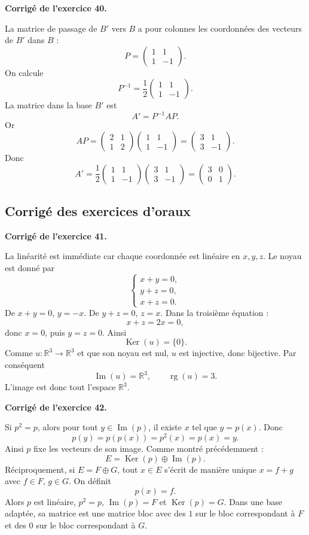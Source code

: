 \documentclass[11pt,a4paper]{article}
\newcommand{\corr}[1]{
    \vspace{0.4cm}
    \noindent\textbf{\textcolor{blue!60!black}{Corrigé de l'exercice #1.}}
    \par\vspace{0.1cm}
}
\newcommand{\Ker}{\operatorname{Ker}}
\newcommand{\Img}{\operatorname{Im}}
\newcommand{\rg}{\operatorname{rg}}
\begin{document}
\corr{40}
La matrice de passage de $B'$ vers $B$ a pour colonnes les coordonnées des vecteurs de $B'$ dans $B$ :
\[
P=
\begin{pmatrix}
1&1\\
1&-1
\end{pmatrix}.
\]
On calcule
\[
P^{-1}=\frac12
\begin{pmatrix}
1&1\\
1&-1
\end{pmatrix}.
\]
La matrice dans la base $B'$ est
\[
A'=P^{-1}AP.
\]
Or
\[
AP=
\begin{pmatrix}
2&1\\
1&2
\end{pmatrix}
\begin{pmatrix}
1&1\\
1&-1
\end{pmatrix}
=
\begin{pmatrix}
3&1\\
3&-1
\end{pmatrix}.
\]
Donc
\[
A'=
\frac12
\begin{pmatrix}
1&1\\
1&-1
\end{pmatrix}
\begin{pmatrix}
3&1\\
3&-1
\end{pmatrix}
=
\begin{pmatrix}
3&0\\
0&1
\end{pmatrix}.
\]

\subsection{Corrigé des exercices d'oraux}

\corr{41}
La linéarité est immédiate car chaque coordonnée est linéaire en $x,y,z$.
Le noyau est donné par
\[
\begin{cases}
x+y=0,\\
y+z=0,\\
x+z=0.
\end{cases}
\]
De $x+y=0$, $y=-x$. De $y+z=0$, $z=x$. Dans la troisième équation :
\[
x+z=2x=0,
\]
donc $x=0$, puis $y=z=0$. Ainsi
\[
\Ker(u)=\{0\}.
\]
Comme $u:\mathbb{R}^3\to\mathbb{R}^3$ et que son noyau est nul, $u$ est injective, donc bijective. Par conséquent
\[
\Img(u)=\mathbb{R}^3,
\qquad
\rg(u)=3.
\]
L'image est donc tout l'espace $\mathbb{R}^3$.

\corr{42}
Si $p^2=p$, alors pour tout $y\in\Img(p)$, il existe $x$ tel que $y=p(x)$. Donc
\[
p(y)=p(p(x))=p^2(x)=p(x)=y.
\]
Ainsi $p$ fixe les vecteurs de son image.
Comme montré précédemment :
\[
E=\Ker(p)\oplus\Img(p).
\]
Réciproquement, si $E=F\oplus G$, tout $x\in E$ s'écrit de manière unique $x=f+g$ avec $f\in F$, $g\in G$. On définit
\[
p(x)=f.
\]
Alors $p$ est linéaire, $p^2=p$, $\Img(p)=F$ et $\Ker(p)=G$. Dans une base adaptée, sa matrice est une matrice bloc avec des $1$ sur le bloc correspondant à $F$ et des $0$ sur le bloc correspondant à $G$.
\end{document}
